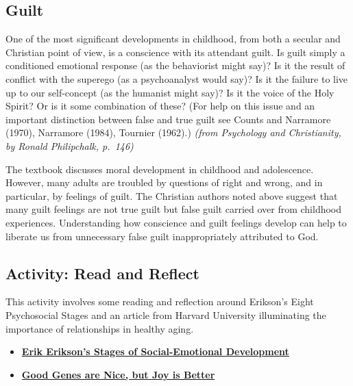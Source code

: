 \documentclass[
]{book}
\providecommand{\tightlist}{%
  \setlength{\itemsep}{0pt}\setlength{\parskip}{0pt}}
\begin{document}
\hypertarget{guilt}{%
\subsection*{Guilt}\label{guilt}}

One of the most significant developments in childhood, from both a secular and Christian point of view, is a conscience with its attendant guilt. Is guilt simply a conditioned emotional response (as the behaviorist might say)? Is it the result of conflict with the superego (as a psychoanalyst would say)? Is it the failure to live up to our self-concept (as the humanist might say)? Is it the voice of the Holy Spirit? Or is it some combination of these? (For help on this issue and an important distinction between false and true guilt see Counts and Narramore (1970), Narramore (1984), Tournier (1962).) \emph{(from Psychology and Christianity, by Ronald Philipchalk, p.~146)}

The textbook discusses moral development in childhood and adolescence. However, many adults are troubled by questions of right and wrong, and in particular, by feelings of guilt. The Christian authors noted above suggest that many guilt feelings are not true guilt but false guilt carried over from childhood experiences. Understanding how conscience and guilt feelings develop can help to liberate us from unnecessary false guilt inappropriately attributed to God.

\hypertarget{activity-read-and-reflect-1}{%
\subsection*{Activity: Read and Reflect}\label{activity-read-and-reflect-1}}

This activity involves some reading and reflection around Erikson's Eight Psychosocial Stages and an article from Harvard University illuminating the importance of relationships in healthy aging.

\begin{itemize}
\tightlist
\item
  \href{https://childdevelopmentinfo.com/child-development/erickson/\#gs.d8mpcv}{\textbf{Erik Erikson's Stages of Social-Emotional Development}}\\
\item
  \href{https://news.harvard.edu/gazette/story/2017/04/over-nearly-80-years-harvard-study-has-been-showing-how-to-live-a-healthy-and-happy-life/}{\textbf{Good Genes are Nice, but Joy is Better}}
\end{itemize}
\end{document}
